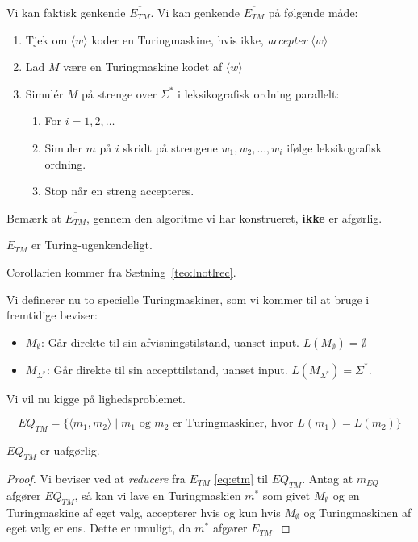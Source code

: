 Vi kan faktisk genkende $\overline{E_{TM}}$. Vi kan genkende $\overline{E_{TM}}$ på følgende måde:
\begin{enumerate}
	\item Tjek om \(\langle w \rangle \) koder en Turingmaskine, hvis ikke, \textit{accepter}  \(\langle w \rangle \)
	\item Lad $M$ være en Turingmaskine kodet af $\langle w \rangle $
	\item Simulér $M$ på strenge over $\Sigma^{*}$ i leksikografisk ordning parallelt:
	      \begin{enumerate}
		      \item For $i = 1, 2, \ldots$
		      \item Simuler $m$ på $i$ skridt på strengene $w_{1}, w_{2}, \ldots, w_{i}$ ifølge leksikografisk ordning.
		      \item Stop når en streng accepteres.
	      \end{enumerate}
\end{enumerate}

Bemærk at $\overline{E_{TM}}$, gennem den algoritme vi har konstrueret, \textbf{ikke} er afgørlig.

\begin{corollary}
	$E_{TM}$ er Turing-ugenkendeligt.
\end{corollary}

Corollarien kommer fra Sætning~\ref{teo:lnotlrec}.

Vi definerer nu to specielle Turingmaskiner, som vi kommer til at bruge i fremtidige beviser:
\begin{itemize}
	\item $M_{\emptyset}$: Går direkte til sin afvisningstilstand, uanset input. $L(M_{\emptyset}) = \emptyset$
	\item $M_{\Sigma^{*}}$: Går direkte til sin accepttilstand, uanset input. $L(M_{\Sigma^{*}}) = \Sigma^{*}$.
\end{itemize}

Vi vil nu kigge på lighedsproblemet.

\begin{equation*}
	EQ_{TM} = \{\langle m_{1}, m_{2} \rangle \mid m_{1} \text{ og } m_{2} \text{ er Turingmaskiner, hvor } L(m_{1}) = L(m_{2})\}
\end{equation*}

\begin{theorem}
	$EQ_{TM}$ er uafgørlig.
\end{theorem}

\begin{proof}
	Vi beviser ved at \textit{reducere} fra $E_{TM}$ \eqref{eq:etm} til $EQ_{TM}$.
	Antag at $m_{EQ}$ afgører $EQ_{TM}$, så kan vi lave en Turingmaskien $m^{*}$ som givet $M_{\emptyset}$ og en Turingmaskine af eget valg, accepterer hvis og kun hvis $M_{\emptyset}$ og Turingmaskinen af eget valg er ens. Dette er umuligt, da $m^{*}$ afgører $E_{TM}$.
\end{proof}

